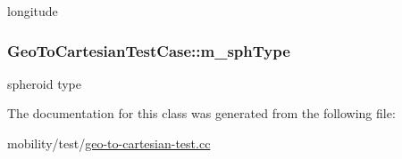 longitude 

\subsubsection[{\texorpdfstring{m\+\_\+sph\+Type}{m_sphType}}]{ Geo\+To\+Cartesian\+Test\+Case\+::m\+\_\+sph\+Type\hspace{0.3cm}{\ttfamily [private]}}\hypertarget{classGeoToCartesianTestCase_abf771e651f997641307173e08610a7d4}{}\label{classGeoToCartesianTestCase_abf771e651f997641307173e08610a7d4}


spheroid type 



The documentation for this class was generated from the following file\+:\begin{DoxyCompactItemize}
\item 
mobility/test/\hyperlink{geo-to-cartesian-test_8cc}{geo-\/to-\/cartesian-\/test.\+cc}\end{DoxyCompactItemize}
